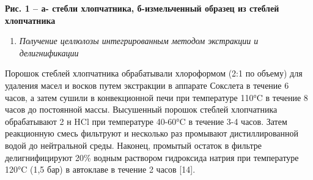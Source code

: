 
{\bfseries Рис. 1 -- а- стебли хлопчатника, б-измельченный образец из
стеблей хлопчатника}

\begin{enumerate}
\def\labelenumi{\arabic{enumi}.}
\item
  \emph{Получение целлюлозы интегрированным методом экстракции и
  делигнификации}
\end{enumerate}

Порошок стеблей хлопчатника обрабатывали хлороформом (2:1 по объему) для
удаления масел и восков путем экстракции в аппарате Сокслета в течение 6
часов, а затем сушили в конвекционной печи при температуре 110°C в
течение 8 часов до постоянной массы. Высушенный порошок стеблей
хлопчатника обрабатывают 2 н HCl при температуре 40-60°C в течение 3-4
часов. Затем реакционную смесь фильтруют и несколько раз промывают
дистиллированной водой до нейтральной среды. Наконец, промытый остаток в
фильтре делигнифицируют 20\% водным раствором гидроксида натрия при
температуре 120°C (1,5 бар) в автоклаве в течение 2 часов {[}14{]}.

